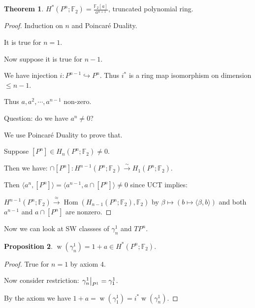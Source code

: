 \documentclass{article}
\theoremstyle{definition}
\newtheorem{theorem}{Theorem}
\newtheorem{proposition}[theorem]{Proposition}
\begin{document}
    \begin{theorem}
        \(H^{\ast} (P^n; \mathbb{F}_2) = \frac{\mathbb{F}_2[a]}{a^{n+1}}\), truncated polynomial ring.
    \end{theorem}

    \begin{proof}
        Induction on \(n\) and Poincar\'e Duality.

        It is true for \(n = 1\).

        Now suppose it is true for \(n - 1\).

        We have injection \(i : P^{n-1} \hookrightarrow P^n\). Thus \(i^{\ast}\) is a ring map isomorphism on dimension \(\leq n - 1\).

        Thus \(a, a^2, \cdots , a^{n-1}\) non-zero.

        Question: do we have \(a^n \neq 0\)?
        
        We use Poincar\'e Duality to prove that.

        Suppose \([P^n] \in H_n(P^n;\mathbb{F}_2) \neq 0\).
        
        Then we have: \(\cap [P^n]: H^{n-1} (P^n;\mathbb{F}_2) \xrightarrow{\sim} H_1(P^n;\mathbb{F}_2)\).
        
        Then \(\langle a^n, [P^n] \rangle = \langle a^{n-1}, a\cap [P^n] \rangle \neq 0\) since UCT implies:
        
        \(H^{n-1}(P^n;\mathbb{F}_2) \xrightarrow{\approx} \operatorname{Hom} (H_{n-1}(P^n;\mathbb{F}_2),\mathbb{F}_2)\) by \(\beta \mapsto (b \mapsto \langle \beta , b \rangle )\) and both \(a^{n-1}\) and \(a\cap [P^n]\) are nonzero.
    \end{proof}

    Now we can look at SW classses of \(\gamma_n^1\) and \(TP^n\).

    \begin{proposition}
        \(\operatorname{w} (\gamma_n^1) = 1 + a \in H^{\ast} (P^n; \mathbb{F}_2)\).
    \end{proposition}

    \begin{proof}
        True for \(n=1\) by axiom \(4\).

        Now consider restriction: \(\eval{\gamma^1_n}_{P^1} = \gamma^1_1\).

        By the axiom we have \(1+a = \operatorname{w}(\gamma^1_1) = i^{\ast} \operatorname{w} (\gamma^1_n)\).
    \end{proof}
\end{document}
